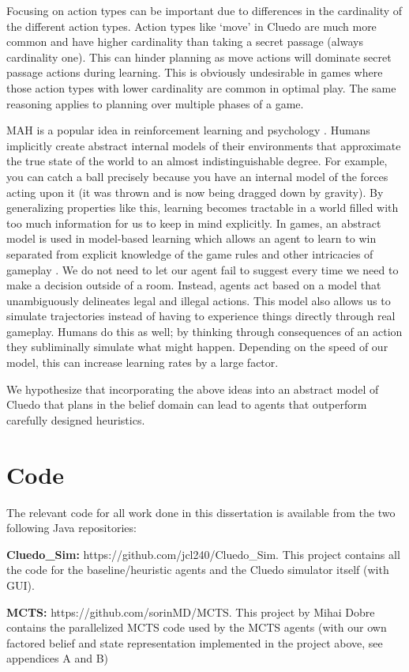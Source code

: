 \documentclass[msc, ai, logo, twoside, notimes, parskip, leftchapter, normalheadings]{infthesis}
\begin{document}
Focusing on action types can be important due to differences in the cardinality of the different action types. Action types like `move' in Cluedo are much more common and have higher cardinality than taking a secret passage (always cardinality one). This can hinder planning as move actions will dominate secret passage actions during learning. This is obviously undesirable in games where those action types with lower cardinality are common in optimal play. The same reasoning applies to planning over multiple phases of a game.

MAH is a popular idea in reinforcement learning and psychology \citep{Sutton-barto} \citep{Mihai}. Humans implicitly create abstract internal models of their environments that approximate the true state of the world to an almost indistinguishable degree. For example, you can catch a ball precisely because you have an internal model of the forces acting upon it (it was thrown and is now being dragged down by gravity). By generalizing properties like this, learning becomes tractable in a world filled with too much information for us to keep in mind explicitly. In games, an abstract model is used in model-based learning which allows an agent to learn to win separated from explicit knowledge of the game rules and other intricacies of gameplay \citep{Sutton-barto}. We do not need to let our agent fail to suggest every time we need to make a decision outside of a room. Instead, agents act based on a model that unambiguously delineates legal and illegal actions. This model also allows us to simulate trajectories instead of having to experience things directly through real gameplay. Humans do this as well; by thinking through consequences of an action they subliminally simulate what might happen. Depending on the speed of our model, this can increase learning rates by a large factor. 

We hypothesize that incorporating the above ideas into an abstract model of Cluedo that plans in the belief domain can lead to agents that outperform carefully designed heuristics.

\section{Code}
The relevant code for all work done in this dissertation is available from the two following Java repositories:
\begin{description}
\item \textbf{Cluedo\_Sim:} https://github.com/jcl240/Cluedo\_Sim. This project contains all the code for the baseline/heuristic agents and the Cluedo simulator itself (with GUI). 
\item \textbf{MCTS:} https://github.com/sorinMD/MCTS. This project by Mihai Dobre contains the parallelized MCTS code used by the MCTS agents (with our own factored belief and state representation implemented in the project above, see appendices A and B)
\end{description}
\end{document}
